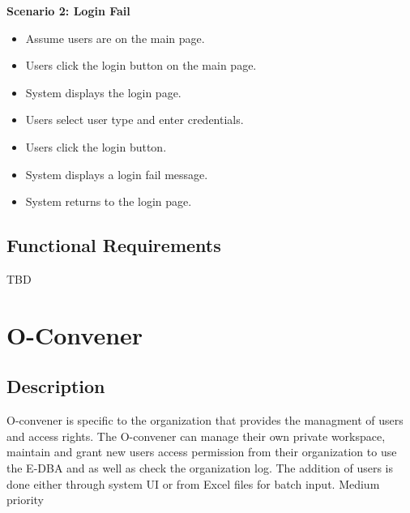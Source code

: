 \textbf{Scenario 2: Login Fail}
\begin{itemize}
    \item Assume users are on the main page.
    \item Users click the login button on the main page.
    \item System displays the login page.
    \item Users select user type and enter credentials.
    \item Users click the login button.
    \item System displays a login fail message.
    \item System returns to the login page.
\end{itemize}

\subsection{Functional Requirements}

TBD

\section{O-Convener}

\subsection{Description}
O-convener is specific to the organization that provides the managment of users and access rights. The O-convener can manage their own private workspace, maintain and grant new users access permission from their organization to use the E-DBA and as well as check the organization log. The addition of users is done either through system UI or from Excel files for batch input. Medium priority


